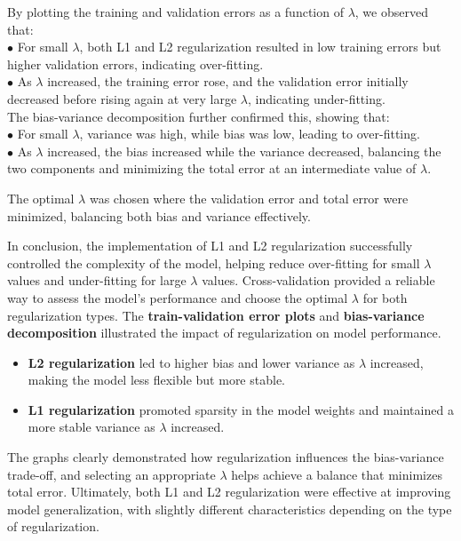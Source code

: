 \documentclass{article}
\begin{document}
By plotting the training and validation errors as a function of $\lambda$, we observed that:\\

$\bullet$ For small $\lambda$, both L1 and L2 regularization resulted in low training errors but higher validation errors, indicating over-fitting.\\
$\bullet$ As $\lambda$ increased, the training error rose, and the validation error initially decreased before rising again at very large $\lambda$, indicating under-fitting.
\\

The bias-variance decomposition further confirmed this, showing that:\\
$\bullet$ For small $\lambda$, variance was high, while bias was low, leading to over-fitting.\\
$\bullet$ As $\lambda$ increased, the bias increased while the variance decreased, balancing the two components and minimizing the total error at an intermediate value of $\lambda$.

The optimal $\lambda$ was chosen where the validation error and total error were minimized, balancing both bias and variance effectively.

In conclusion, the implementation of L1 and L2 regularization successfully controlled the complexity of the model, helping reduce over-fitting for small $\lambda$ values and under-fitting for large $\lambda$ values. Cross-validation provided a reliable way to assess the model's performance and choose the optimal $\lambda$ for both regularization types. The\textbf{ train-validation error plots} 
and \textbf{bias-variance decomposition} illustrated the impact of regularization on model performance.

\begin{itemize}
    \item \textbf{L2 regularization} led to higher bias and lower variance as $\lambda$ increased, making the model less flexible but more stable.

    \item \textbf{L1 regularization} promoted sparsity in the model weights and maintained a more stable variance as $\lambda$ increased.
\end{itemize}

The graphs clearly demonstrated how regularization influences the bias-variance trade-off, and selecting an appropriate $\lambda$ helps achieve a balance that minimizes total error. Ultimately, both L1 and L2 regularization were effective at improving model generalization, with slightly different characteristics depending on the type of regularization.
\end{document}
